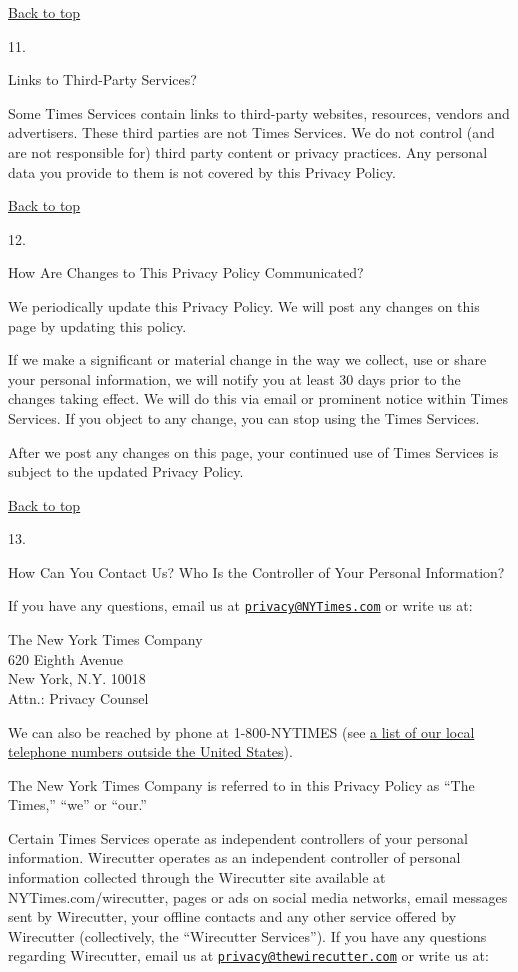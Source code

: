 \href{app}{Back to top}

11.

Links to Third-Party Services?

Some Times Services contain links to third-party websites, resources,
vendors and advertisers. These third parties are not Times Services. We
do not control (and are not responsible for) third party content or
privacy practices. Any personal data you provide to them is not covered
by this Privacy Policy.

\href{app}{Back to top}

12.

How Are Changes to This Privacy Policy Communicated?

We periodically update this Privacy Policy. We will post any changes on
this page by updating this policy.

If we make a significant or material change in the way we collect, use
or share your personal information, we will notify you at least 30 days
prior to the changes taking effect. We will do this via email or
prominent notice within Times Services. If you object to any change, you
can stop using the Times Services.

After we post any changes on this page, your continued use of Times
Services is subject to the updated Privacy Policy.

\href{app}{Back to top}

13.

How Can You Contact Us? Who Is the Controller of Your Personal
Information?

If you have any questions, email us at
\href{mailto:privacy@NYTimes.com}{\nolinkurl{privacy@NYTimes.com}} or
write us at:

The New York Times Company\\
620 Eighth Avenue\\
New York, N.Y. 10018\\
Attn.: Privacy Counsel

We can also be reached by phone at 1-800-NYTIMES (see
\href{https://subscribe.inyt.com/footer?requestAction=displayContactIht}{a
list of our local telephone numbers outside the United States}).

The New York Times Company is referred to in this Privacy Policy as
``The Times,'' ``we'' or ``our.''

Certain Times Services operate as independent controllers of your
personal information. Wirecutter operates as an independent controller
of personal information collected through the Wirecutter site available
at NYTimes.com/wirecutter, pages or ads on social media networks, email
messages sent by Wirecutter, your offline contacts and any other service
offered by Wirecutter (collectively, the ``Wirecutter Services''). If
you have any questions regarding Wirecutter, email us at
\href{mailto:privacy@thewirecutter.com}{\nolinkurl{privacy@thewirecutter.com}}
or write us at:

